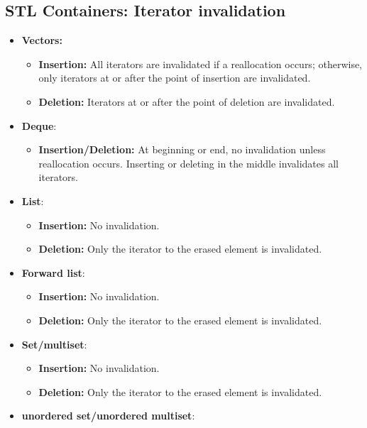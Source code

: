 \documentclass{report}
\begin{document}
   \subsection{STL Containers: Iterator invalidation}
   \begin{itemize}
       \item \textbf{Vectors:} 
           \begin{itemize}
               \item \textbf{Insertion:} All iterators are invalidated if a reallocation occurs; otherwise, only iterators at or after the point of insertion are invalidated.
               \item \textbf{Deletion:} Iterators at or after the point of deletion are invalidated.
           \end{itemize}
        \item \textbf{Deque}: 
            \begin{itemize}
                \item \textbf{Insertion/Deletion:} At beginning or end, no invalidation unless reallocation occurs. Inserting or deleting in the middle invalidates all iterators.
            \end{itemize}
        \item \textbf{List}:
            \begin{itemize}
                \item \textbf{Insertion:} No invalidation.
                \item \textbf{Deletion:} Only the iterator to the erased element is invalidated.
            \end{itemize}
        \item \textbf{Forward list}:
            \begin{itemize}
                \item \textbf{Insertion:} No invalidation.
                \item \textbf{Deletion:} Only the iterator to the erased element is invalidated.
            \end{itemize}
        \item \textbf{Set/multiset}:
            \begin{itemize}
                \item \textbf{Insertion:} No invalidation.
                \item \textbf{Deletion:} Only the iterator to the erased element is invalidated.
            \end{itemize}
        \item \textbf{unordered set/unordered multiset}:

\end{itemize}
\end{document}
